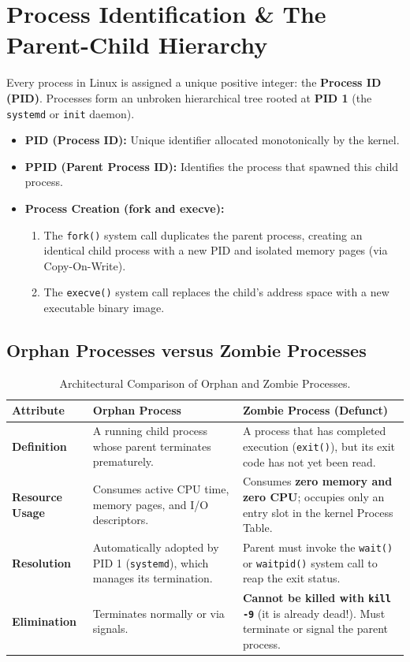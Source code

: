 \section{Process Identification \& The Parent-Child Hierarchy}
Every process in Linux is assigned a unique positive integer: the \textbf{Process ID (PID)}. Processes form an unbroken hierarchical tree rooted at \textbf{PID 1} (the \texttt{systemd} or \texttt{init} daemon).
\begin{itemize}[leftmargin=1.5em]
    \item \textbf{PID (Process ID):} Unique identifier allocated monotonically by the kernel.
    \item \textbf{PPID (Parent Process ID):} Identifies the process that spawned this child process.
    \item \textbf{Process Creation (fork and execve):}
    \begin{enumerate}
        \item The \texttt{fork()} system call duplicates the parent process, creating an identical child process with a new PID and isolated memory pages (via Copy-On-Write).
        \item The \texttt{execve()} system call replaces the child's address space with a new executable binary image.
    \end{enumerate}
\end{itemize}

\subsection{Orphan Processes versus Zombie Processes}
\begin{table}[htbp]
\centering
\small
\begin{tabularx}{\linewidth}{l X X}
\toprule
\textbf{Attribute} & \textbf{Orphan Process} & \textbf{Zombie Process (Defunct)} \\
\midrule
\textbf{Definition} & A running child process whose parent terminates prematurely. & A process that has completed execution (\texttt{exit()}), but its exit code has not yet been read. \\
\textbf{Resource Usage} & Consumes active CPU time, memory pages, and I/O descriptors. & Consumes \textbf{zero memory and zero CPU}; occupies only an entry slot in the kernel Process Table. \\
\textbf{Resolution} & Automatically adopted by PID 1 (\texttt{systemd}), which manages its termination. & Parent must invoke the \texttt{wait()} or \texttt{waitpid()} system call to reap the exit status. \\
\textbf{Elimination} & Terminates normally or via signals. & \textbf{Cannot be killed with \texttt{kill -9}} (it is already dead!). Must terminate or signal the parent process. \\
\bottomrule
\end{tabularx}
\caption{Architectural Comparison of Orphan and Zombie Processes.}
\label{tab:orphan-zombie}
\end{table}

